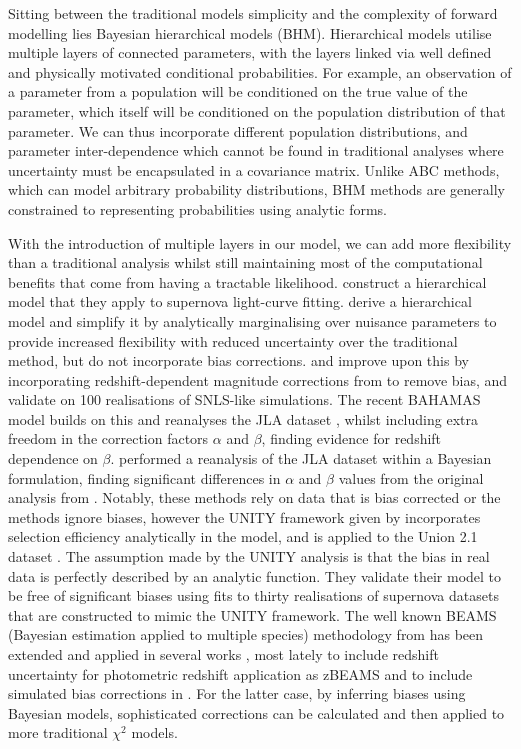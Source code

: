 \documentclass[a4paper,fleqn,usenatbib,manuscript]{emulateapj}
\begin{document}
Sitting between the traditional models simplicity and the complexity of forward modelling lies Bayesian hierarchical models (BHM). Hierarchical models utilise multiple layers of connected parameters, with the layers linked via well defined and physically motivated conditional probabilities. For example, an observation of a parameter from a population will be conditioned on the true value of the parameter, which itself will be conditioned on the population distribution of that parameter. We can thus incorporate different population distributions, and parameter inter-dependence which cannot be found in traditional analyses where uncertainty must be encapsulated in a covariance matrix. Unlike ABC methods, which can model arbitrary probability distributions, BHM methods are generally constrained to representing probabilities using analytic forms.

With the introduction of multiple layers in our model, we can add more flexibility than a traditional analysis whilst still maintaining most of the computational benefits that come from having a tractable likelihood. \citet{Mandel2009, Mandel2011a, Mandel2017} construct a hierarchical model that they apply to supernova light-curve fitting. \citet{March2011} derive a hierarchical model and simplify it by analytically marginalising over nuisance parameters to provide increased flexibility with reduced uncertainty over the traditional method, but do not incorporate bias corrections. \citet{March2014} and \citet{Karpenka2015} improve upon this by incorporating redshift-dependent magnitude corrections from \citet{Perrett2010} to remove bias, and validate on 100 realisations of SNLS-like simulations. The recent BAHAMAS model \citep{Shariff2016} builds on this and reanalyses the JLA dataset \citep[using redshift dependent bias corrections from][]{Betoule2014}, whilst including extra freedom in the correction factors $\alpha$ and $\beta$, finding evidence for redshift dependence on $\beta$. \citet{Ma2016} performed a reanalysis of the JLA dataset within a Bayesian formulation, finding significant differences in $\alpha$ and $\beta$ values from the original analysis from \citet{Betoule2014}. Notably, these methods rely on data that is bias corrected or the methods ignore biases, however the UNITY framework given by \citet{Rubin2015} incorporates selection efficiency analytically in the model, and is applied to the Union 2.1 dataset \citep{Suzuki2012}. The assumption made by the UNITY analysis is that the bias in real data is perfectly described by an analytic function. They validate their  model to be free of significant biases using fits to thirty realisations of supernova datasets that are constructed to mimic the UNITY framework. The well known BEAMS (Bayesian estimation applied to multiple species) methodology from \citet{Kunz2007} has been extended and applied in several works \citep{Hlozek2012}, most lately to include redshift uncertainty for photometric redshift application as zBEAMS \citep{Roberts2017} and to include simulated bias corrections in \citet{Kessler2017}. For the latter case, by inferring biases using Bayesian models, sophisticated corrections can be calculated and then applied to more traditional $\chi^2$ models.
\end{document}
